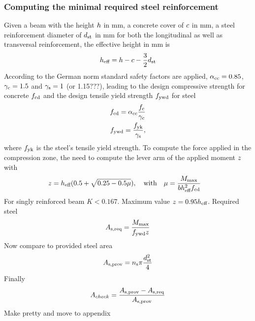 \subsubsection{Computing the minimal required steel reinforcement}
Given a beam with the height $h$ in mm, a concrete cover of $c$ in mm, a steel reinforcement diameter of $d_{\text{st}}$ in mm for both the longitudinal as well as transversal reinforcement, the effective height in mm is
\begin{align}
	h_{\text{eff}} = h - c - \frac{3}{2} d_{\text{st}}
\end{align}
According to the German norm standard safety factors are applied, $\alpha_{\text{cc}} = 0.85$, $\gamma_{\text{c}} = 1.5$ and $\gamma_{\text{s}} = 1$ (or 1.15???), leading to the design compressive strength for concrete $f_{\text{cd}}$ and  the design tensile yield strength $f_{\text{ywd}}$ for steel
\begin{align}
	f_{\text{cd}} = \alpha_{\text{cc}} \frac{f_{\text{c}} }{\gamma_{\text{c}}}\\
	f_{\text{ywd}} = \frac{f_{\text{yk}}}{\gamma_{\text{s}}},
\end{align}
where $f_{\text{yk}}$ is the steel's tensile yield strength.
To compute the force applied in the compression zone, the need to compute the lever arm of the applied moment $z$ with 
\begin{align}
	z &= h_{\text{eff}}(0.5+\sqrt{0.25-0.5 \mu}),\quad \text{with}\quad
	\mu = \frac{M_{\text{max}} }{b h_{\text{eff}}^2 f_{\text{cd}}}
\end{align}
For singly reinforced beam $K < 0.167$.
Maximum value $z = 0.95h_{\text{eff}}$.
Required steel
\begin{align}
A_{\text{s,req}} = \frac{M_{\text{max}}}{f_{\text{ywd}} z}
\end{align}
Now compare to provided steel area
\begin{align}
	A_{\text{s,prov}} = n_{\text{s}} \pi \frac{d_{\text{st}}^2}{4} 
\end{align}
Finally 
\begin{align}
	A_{check} = \frac{A_{\text{s,prov}} - A_{\text{s,req}}}{A_{\text{s,prov}}}
\end{align}
Make pretty and move to appendix
